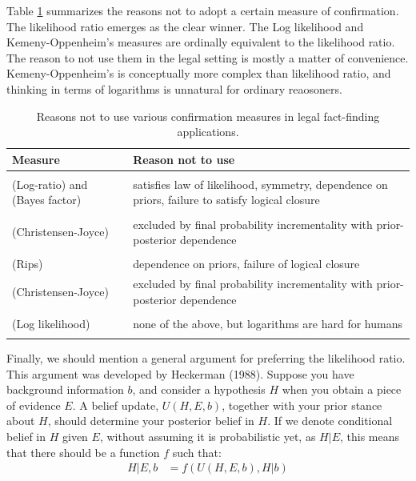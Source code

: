 \documentclass[
  10pt,
  dvipsnames,enabledeprecatedfontcommands]{scrartcl}
\begin{document}
Table \ref{tab:confirmation} summarizes the reasons not to adopt a
certain measure of confirmation. The likelihood ratio emerges as the
clear winner. The Log likelihood and Kemeny-Oppenheim's measures are
ordinally equivalent to the likelihood ratio. The reason to not use them
in the legal setting is mostly a matter of convenience.
Kemeny-Oppenheim's is conceptually more complex than likelihood ratio,
and thinking in terms of logarithms is unnatural for ordinary
reaosoners.

\begin{table}
\centering\begingroup\fontsize{9}{11}\selectfont

\begin{tabular}{lp{10cm}}
\toprule
Measure & Reason not to use\\
\midrule
\cellcolor{gray!6}{(Difference)} & \cellcolor{gray!6}{dependence on priors, logical closure failure}\\
(Log-ratio) and (Bayes factor) & satisfies law of likelihood, symmetry, dependence on priors, failure to satisfy logical closure\\
\cellcolor{gray!6}{(Generalized entailment)} & \cellcolor{gray!6}{dependence on priors, independent conflicting evidence}\\
(Christensen-Joyce) & excluded by final probability incrementality with prior-posterior dependence\\
\cellcolor{gray!6}{(Carnap)} & \cellcolor{gray!6}{excluded by final probability incrementality with prior-posterior dependence, symmetry, logical closure failure}\\
(Rips) & dependence on priors, failure of logical closure\\
(Christensen-Joyce) & excluded by final probability incrementality with prior-posterior dependence\\
\cellcolor{gray!6}{(Kemeny-Oppenheim)} & \cellcolor{gray!6}{none of the above, but unnecessarily complex}\\
(Log likelihood) & none of the above, but logarithms are hard for humans\\
\cellcolor{gray!6}{(Likelihood ratio)} & \cellcolor{gray!6}{none of the above}\\
\bottomrule
\end{tabular}
\endgroup{}
\caption{Reasons not to use various confirmation measures in legal fact-finding applications.}
\label{tab:confirmation}
\end{table}

Finally, we should mention a general argument for preferring the
likelihood ratio. This argument was developed by Heckerman (1988).
Suppose you have background information \(b\), and consider a hypothesis
\(H\) when you obtain a piece of evidence \(E\). A belief update,
\(U(H, E, b)\), together with your prior stance about \(H\), should
determine your posterior belief in \(H\). If we denote conditional
belief in \(H\) given \(E\), without assuming it is probabilistic yet,
as \(H\vert E\), this means that there should be a function \(f\) such
that: \begin{align*}
H \vert E, b & = f(U(H,E,b), H \vert b)
\end{align*}
\end{document}
